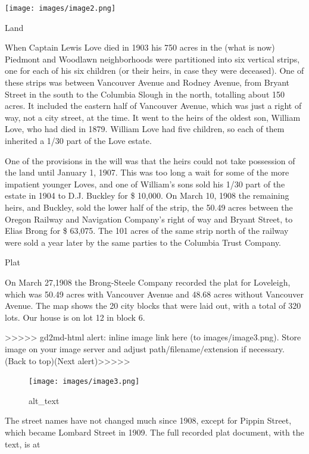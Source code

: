 \documentclass[
  12pt,
]{book}
\begin{document}
\texttt{[image: images/image2.png]}

Land

When Captain Lewis Love died in 1903 his 750 acres in the (what is now) Piedmont and Woodlawn neighborhoods were partitioned into six vertical strips, one for each of his six children (or their heirs, in case they were deceased). One of these strips was between Vancouver Avenue and Rodney Avenue, from Bryant Street in the south to the Columbia Slough in the north, totalling about 150 acres. It included the eastern half of Vancouver Avenue, which was just a right of way, not a city street, at the time. It went to the heirs of the oldest son, William Love, who had died in 1879. William Love had five children, so each of them inherited a 1/30 part of the Love estate.

One of the provisions in the will was that the heirs could not take possession of the land until January 1, 1907. This was too long a wait for some of the more impatient younger Loves, and one of William's sons sold his 1/30 part of the estate in 1904 to D.J. Buckley for \$ 10,000. On March 10, 1908 the remaining heirs, and Buckley, sold the lower half of the strip, the 50.49 acres between the Oregon Railway and Navigation Company's right of way and Bryant Street, to Elias Brong for \$ 63,075. The 101 acres of the same strip north of the railway were sold a year later by the same parties to the Columbia Trust Company.

Plat

On March 27,1908 the Brong-Steele Company recorded the plat for Loveleigh, which was 50.49 acres with Vancouver Avenue and 48.68 acres without Vancouver Avenue. The map shows the 20 city blocks that were laid out, with a total of 320 lots. Our house is on lot 12 in block 6.

{\textgreater\textgreater\textgreater\textgreater\textgreater{} gd2md-html alert: inline image link here (to images/image3.png). Store image on your image server and adjust path/filename/extension if necessary. }(Back to top)(Next alert){\textgreater\textgreater\textgreater\textgreater\textgreater{} }

\begin{figure}
\centering
\texttt{[image: images/image3.png]}
\caption{alt\_text}
\end{figure}

The street names have not changed much since 1908, except for Pippin Street, which became Lombard Street in 1909. The full recorded plat document, with the text, is at
\end{document}
